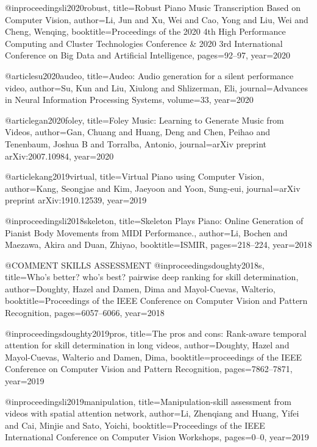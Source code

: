 @inproceedings{li2020robust,
  title={Robust Piano Music Transcription Based on Computer Vision},
  author={Li, Jun and Xu, Wei and Cao, Yong and Liu, Wei and Cheng, Wenqing},
  booktitle={Proceedings of the 2020 4th High Performance Computing and Cluster Technologies Conference \& 2020 3rd International Conference on Big Data and Artificial Intelligence},
  pages={92--97},
  year={2020}
}

@article{su2020audeo,
  title={Audeo: Audio generation for a silent performance video},
  author={Su, Kun and Liu, Xiulong and Shlizerman, Eli},
  journal={Advances in Neural Information Processing Systems},
  volume={33},
  year={2020}
}

@article{gan2020foley,
  title={Foley Music: Learning to Generate Music from Videos},
  author={Gan, Chuang and Huang, Deng and Chen, Peihao and Tenenbaum, Joshua B and Torralba, Antonio},
  journal={arXiv preprint arXiv:2007.10984},
  year={2020}
}

@article{kang2019virtual,
  title={Virtual Piano using Computer Vision},
  author={Kang, Seongjae and Kim, Jaeyoon and Yoon, Sung-eui},
  journal={arXiv preprint arXiv:1910.12539},
  year={2019}
}


@inproceedings{li2018skeleton,
  title={Skeleton Plays Piano: Online Generation of Pianist Body Movements from MIDI Performance.},
  author={Li, Bochen and Maezawa, Akira and Duan, Zhiyao},
  booktitle={ISMIR},
  pages={218--224},
  year={2018}
}




@COMMENT SKILLS ASSESSMENT
@inproceedings{doughty2018s,
  title={Who's better? who's best? pairwise deep ranking for skill determination},
  author={Doughty, Hazel and Damen, Dima and Mayol-Cuevas, Walterio},
  booktitle={Proceedings of the IEEE Conference on Computer Vision and Pattern Recognition},
  pages={6057--6066},
  year={2018}
}

@inproceedings{doughty2019pros,
  title={The pros and cons: Rank-aware temporal attention for skill determination in long videos},
  author={Doughty, Hazel and Mayol-Cuevas, Walterio and Damen, Dima},
  booktitle={proceedings of the IEEE Conference on Computer Vision and Pattern Recognition},
  pages={7862--7871},
  year={2019}
}

@inproceedings{li2019manipulation,
  title={Manipulation-skill assessment from videos with spatial attention network},
  author={Li, Zhenqiang and Huang, Yifei and Cai, Minjie and Sato, Yoichi},
  booktitle={Proceedings of the IEEE International Conference on Computer Vision Workshops},
  pages={0--0},
  year={2019}
}

